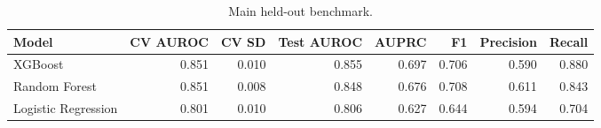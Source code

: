 \begin{table}[htbp]
\centering
\caption{Main held-out benchmark.}
\label{tab:main_benchmark_recomputed}
\begin{tabular}{lrrrrrrr}
\toprule
Model & CV AUROC & CV SD & Test AUROC & AUPRC & F1 & Precision & Recall \\
\midrule
XGBoost & 0.851 & 0.010 & 0.855 & 0.697 & 0.706 & 0.590 & 0.880 \\
Random Forest & 0.851 & 0.008 & 0.848 & 0.676 & 0.708 & 0.611 & 0.843 \\
Logistic Regression & 0.801 & 0.010 & 0.806 & 0.627 & 0.644 & 0.594 & 0.704 \\
\bottomrule
\end{tabular}

\end{table}
